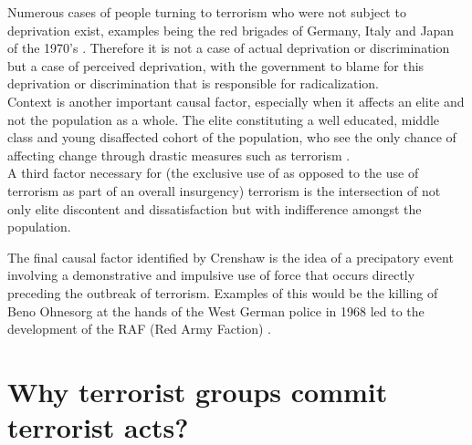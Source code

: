 Numerous cases of people turning to terrorism who were not subject to deprivation exist, examples being the red brigades of Germany, Italy and Japan of the 1970's \citep{zwerman2000disappearing}. Therefore it is not a case of actual deprivation or discrimination but a case of perceived deprivation, with the government to blame for this deprivation or discrimination that is responsible for radicalization.
\\
Context is another important causal factor, especially when it affects an elite and not the population as a whole.  The elite constituting a well educated, middle class and young disaffected cohort of the population, who see the only chance of affecting change through drastic measures such as terrorism \citep{ronchey1979guns}.
\\
A third factor necessary for (the exclusive use of as opposed to the use of terrorism as part of an overall insurgency) terrorism is the intersection of not only elite discontent and dissatisfaction but with indifference amongst the population. 

The final causal factor identified by Crenshaw \citep{crenshaw1981causes} is the idea of a precipatory event involving a demonstrative and impulsive use of force that occurs directly preceding the outbreak of terrorism. Examples of this would be the killing of Beno Ohnesorg at the hands of the West German police in 1968 led to the development of the RAF (Red Army Faction) \citep{jazic2013rise}.

\section{Why terrorist groups commit terrorist acts?}

